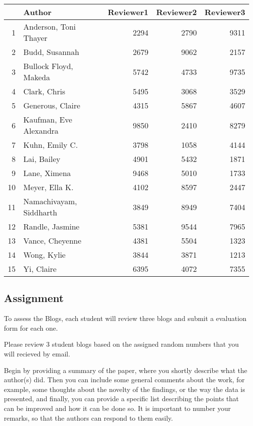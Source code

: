 \documentclass{tufte-handout}\usepackage[]{graphicx}\usepackage[]{color}
\begin{document}
\begin{table}[ht]
\centering
\begin{tabular}{rlrrr}
  \hline
 & Author & Reviewer1 & Reviewer2 & Reviewer3 \\ 
  \hline
1 & Anderson, Toni Thayer & 2294 & 2790 & 9311 \\ 
  2 & Budd, Susannah & 2679 & 9062 & 2157 \\ 
  3 & Bullock Floyd, Makeda & 5742 & 4733 & 9735 \\ 
  4 & Clark, Chris & 5495 & 3068 & 3529 \\ 
  5 & Generous, Claire & 4315 & 5867 & 4607 \\ 
  6 & Kaufman, Eve Alexandra & 9850 & 2410 & 8279 \\ 
  7 & Kuhn, Emily C. & 3798 & 1058 & 4144 \\ 
  8 & Lai, Bailey & 4901 & 5432 & 1871 \\ 
  9 & Lane, Ximena & 9468 & 5010 & 1733 \\ 
  10 & Meyer, Ella K. & 4102 & 8597 & 2447 \\ 
  11 & Namachivayam, Siddharth & 3849 & 8949 & 7404 \\ 
  12 & Randle, Jasmine & 5381 & 9544 & 7965 \\ 
  13 & Vance, Cheyenne & 4381 & 5504 & 1323 \\ 
  14 & Wong, Kylie & 3844 & 3871 & 1213 \\ 
  15 & Yi, Claire & 6395 & 4072 & 7355 \\ 
   \hline
\end{tabular}
\end{table}



\subsection{Assignment}

To assess the Blogs, each student will review three blogs and submit a evaluation form for each one. 

Please review 3 student blogs based on the assigned random numbers that you will recieved by email. 

Begin by providing a summary of the paper, where you shortly describe what the author(s) did. Then you can include some general comments about the work, for example, some thoughts about the novelty of the findings, or the way the data is presented, and finally, you can provide a specific list describing the points that can be improved and how it can be done so. It is important to number your remarks, so that the authors can respond to them easily.
\end{document}
